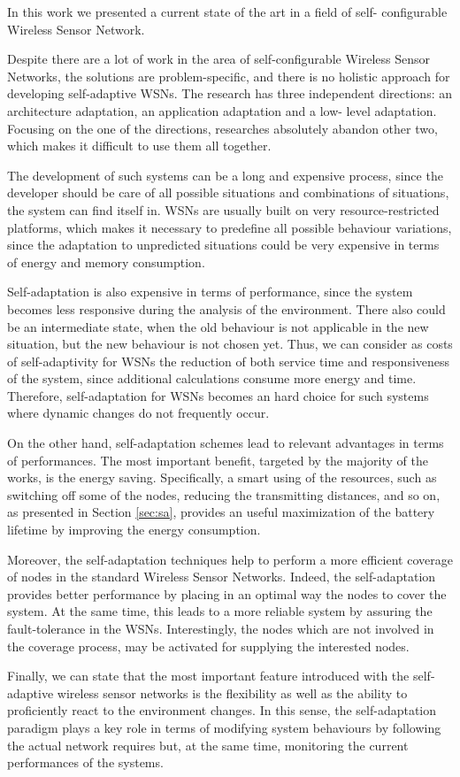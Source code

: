 In this work we presented a current state of the art in a field of self-
configurable Wireless Sensor Network. 

Despite there are a lot of work in the area of self-configurable Wireless
Sensor Networks, the solutions are problem-specific, and there is no holistic
approach for developing self-adaptive WSNs. The research has three independent
directions: an architecture adaptation, an application adaptation and a low-
level adaptation. Focusing on the one of the directions, researches absolutely
abandon other two, which makes it difficult to use them all together.

The development of such systems can be a long and expensive process, since
the developer should be care of all possible situations and combinations of
situations, the system can find itself in. WSNs are usually built on very
resource-restricted platforms, which makes it necessary to predefine all
possible behaviour variations, since the adaptation to unpredicted situations
could be very expensive in terms of energy and memory consumption.

Self-adaptation is also expensive in terms of performance, since the system
becomes less responsive during the analysis of the environment. There also could
be an intermediate state, when the old behaviour is not applicable in the new
situation, but the new behaviour is not chosen yet. Thus, we can consider as costs of self-adaptivity for WSNs the reduction of both service time and responsiveness of the system, since additional calculations consume more energy and time. Therefore, self-adaptation for WSNs becomes an hard choice for such systems where dynamic changes do not frequently occur. 

On the other hand, self-adaptation schemes lead to relevant advantages in terms of performances. The most important benefit, targeted by the majority of the works, is the energy saving. Specifically, a smart using of the resources, such as switching off some of the nodes, reducing the transmitting distances, and so on, as presented in Section \ref{sec:sa}, provides an useful maximization of the battery lifetime by improving the energy consumption. 

Moreover, the self-adaptation techniques help to perform a more efficient coverage of nodes in the standard Wireless Sensor Networks. Indeed, the self-adaptation provides better performance by placing in an optimal way the nodes to cover the system. At the same time, this leads to a more reliable system by assuring the fault-tolerance in the WSNs. Interestingly, the nodes which are not involved in the coverage process, may be activated for supplying the interested nodes.

Finally, we can state that the most important feature introduced with the self-adaptive wireless sensor networks is the flexibility as well as the ability to proficiently react to the environment changes. In this sense, the self-adaptation paradigm plays a key role in terms of modifying system behaviours by following the actual network requires but, at the same time, monitoring the current performances of the systems.



